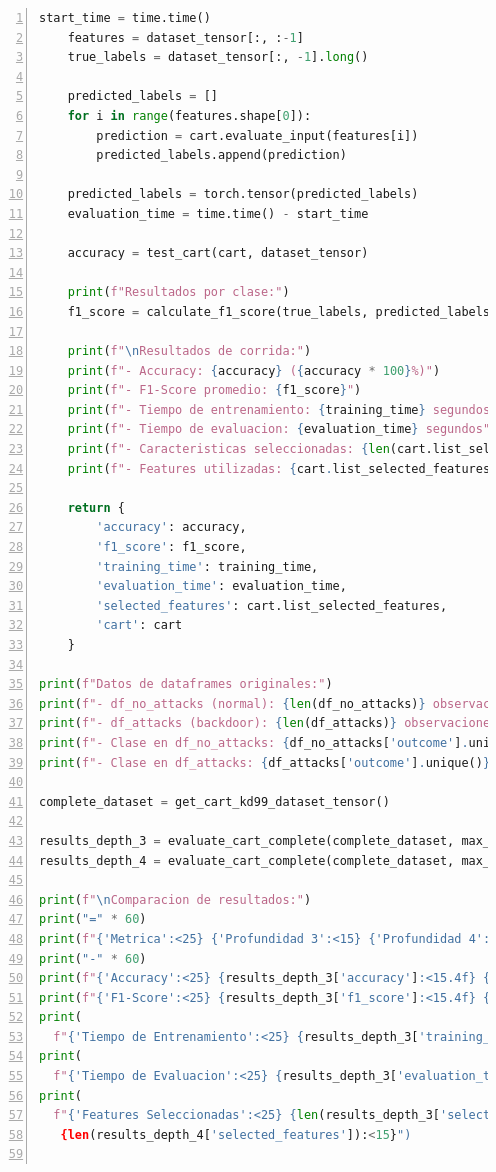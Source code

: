 \documentclass[12pt,a4paper]{article}
\begin{document}
\begin{lstlisting}[language=Python, numbers=left, basicstyle=\ttfamily\tiny,label={lst:lstlisting9}]
    start_time = time.time()
    features = dataset_tensor[:, :-1]
    true_labels = dataset_tensor[:, -1].long()

    predicted_labels = []
    for i in range(features.shape[0]):
        prediction = cart.evaluate_input(features[i])
        predicted_labels.append(prediction)

    predicted_labels = torch.tensor(predicted_labels)
    evaluation_time = time.time() - start_time

    accuracy = test_cart(cart, dataset_tensor)

    print(f"Resultados por clase:")
    f1_score = calculate_f1_score(true_labels, predicted_labels, num_classes=2, print_results=True)

    print(f"\nResultados de corrida:")
    print(f"- Accuracy: {accuracy} ({accuracy * 100}%)")
    print(f"- F1-Score promedio: {f1_score}")
    print(f"- Tiempo de entrenamiento: {training_time} segundos")
    print(f"- Tiempo de evaluacion: {evaluation_time} segundos")
    print(f"- Caracteristicas seleccionadas: {len(cart.list_selected_features)}")
    print(f"- Features utilizadas: {cart.list_selected_features}")

    return {
        'accuracy': accuracy,
        'f1_score': f1_score,
        'training_time': training_time,
        'evaluation_time': evaluation_time,
        'selected_features': cart.list_selected_features,
        'cart': cart
    }

print(f"Datos de dataframes originales:")
print(f"- df_no_attacks (normal): {len(df_no_attacks)} observaciones")
print(f"- df_attacks (backdoor): {len(df_attacks)} observaciones")
print(f"- Clase en df_no_attacks: {df_no_attacks['outcome'].unique()}")
print(f"- Clase en df_attacks: {df_attacks['outcome'].unique()}")

complete_dataset = get_cart_kd99_dataset_tensor()

results_depth_3 = evaluate_cart_complete(complete_dataset, max_depth=3, min_observations=2)
results_depth_4 = evaluate_cart_complete(complete_dataset, max_depth=4, min_observations=2)

print(f"\nComparacion de resultados:")
print("=" * 60)
print(f"{'Metrica':<25} {'Profundidad 3':<15} {'Profundidad 4':<15}")
print("-" * 60)
print(f"{'Accuracy':<25} {results_depth_3['accuracy']:<15.4f} {results_depth_4['accuracy']:<15.4f}")
print(f"{'F1-Score':<25} {results_depth_3['f1_score']:<15.4f} {results_depth_4['f1_score']:<15.4f}")
print(
  f"{'Tiempo de Entrenamiento':<25} {results_depth_3['training_time']:<15.4f} {results_depth_4['training_time']:<15.4f}")
print(
  f"{'Tiempo de Evaluacion':<25} {results_depth_3['evaluation_time']:<15.4f} {results_depth_4['evaluation_time']:<15.4f}")
print(
  f"{'Features Seleccionadas':<25} {len(results_depth_3['selected_features']):<15}
   {len(results_depth_4['selected_features']):<15}")


\end{lstlisting}
\end{document}
